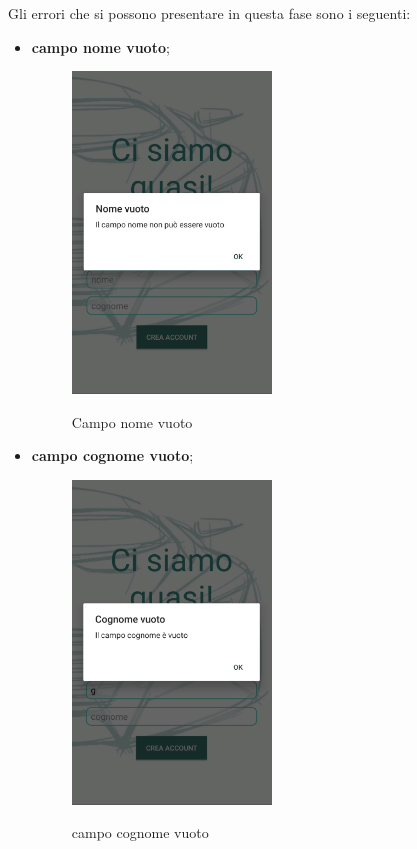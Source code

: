 \pagebreak
Gli errori che si possono presentare in questa fase sono i seguenti:
\begin{itemize}
	\item \textbf{campo nome vuoto};
	\begin{figure}[H] 
		\centering 
		\includegraphics[width=0.5\textwidth]{res/images/errore_nome.png}\\
		\caption{Campo nome vuoto}
		\label{error_name}
	\end{figure}
	\pagebreak
	\item \textbf{campo cognome vuoto};
	\begin{figure}[H] 
		\centering 
		\includegraphics[width=0.5\textwidth]{res/images/errore_cognome.png}\\
		\caption{campo cognome vuoto}
		\label{error_surname}
	\end{figure}
\end{itemize}

